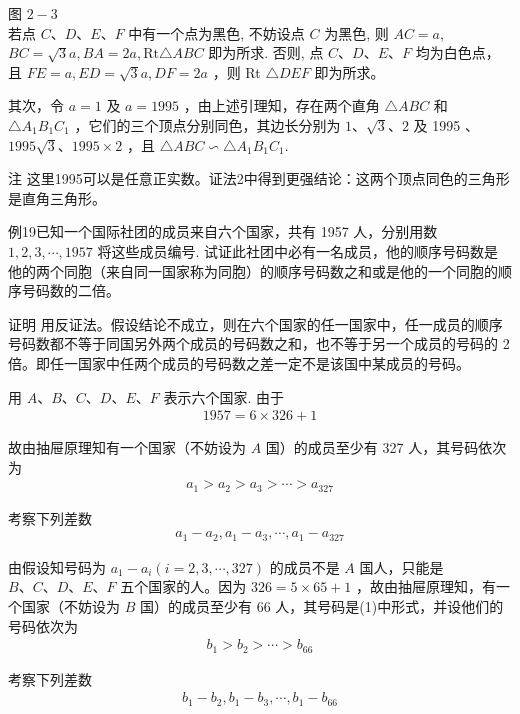 \documentclass[10pt]{article}
\begin{document}
图 $2-3$\\
若点 $C 、 D 、 E 、 F$ 中有一个点为黑色, 不妨设点 $C$ 为黑色, 则 $A C=a$, $B C=\sqrt{3} a, B A=2 a, \mathrm{Rt} \triangle A B C$ 即为所求. 否则, 点 $C 、 D 、 E 、 F$ 均为白色点，且 $F E=a, E D=\sqrt{3} a, D F=2 a$ ，则 Rt $\triangle D E F$ 即为所求。

其次，令 $a=1$ 及 $a=1995$ ，由上述引理知，存在两个直角 $\triangle A B C$ 和 $\triangle A_{1} B_{1} C_{1}$ ，它们的三个顶点分别同色，其边长分别为 $1 、 \sqrt{3} 、 2$ 及 1995 、 $1995 \sqrt{3} 、 1995 \times 2$ ，且 $\triangle A B C \backsim \triangle A_{1} B_{1} C_{1}$.

注 这里1995可以是任意正实数。证法2中得到更强结论：这两个顶点同色的三角形是直角三角形。

例19已知一个国际社团的成员来自六个国家，共有 1957 人，分别用数 $1,2,3, \cdots, 1957$ 将这些成员编号. 试证此社团中必有一名成员，他的顺序号码数是他的两个同胞（来自同一国家称为同胞）的顺序号码数之和或是他的一个同胞的顺序号码数的二倍。

证明 用反证法。假设结论不成立，则在六个国家的任一国家中，任一成员的顺序号码数都不等于同国另外两个成员的号码数之和，也不等于另一个成员的号码的 2 倍。即任一国家中任两个成员的号码数之差一定不是该国中某成员的号码。

用 $A 、 B 、 C 、 D 、 E 、 F$ 表示六个国家. 由于\\
\begin{align*}
1957=6 \times 326+1
\end{align*}

故由抽屉原理知有一个国家（不妨设为 $A$ 国）的成员至少有 327 人，其号码依次为\\
\begin{align*}
a_{1}>a_{2}>a_{3}>\cdots>a_{327}
\end{align*}

考察下列差数\\
\begin{align*}
a_{1}-a_{2}, a_{1}-a_{3}, \cdots, a_{1}-a_{327}
\end{align*}

由假设知号码为 $a_{1}-a_{i}(i=2,3, \cdots, 327)$ 的成员不是 $A$ 国人，只能是 $B 、 C 、 D 、 E 、 F$ 五个国家的人。因为 $326=5 \times 65+1$ ，故由抽屉原理知，有一个国家（不妨设为 $B$ 国）的成员至少有 66 人，其号码是(1)中形式，并设他们的号码依次为\\
\begin{align*}
b_{1}>b_{2}>\cdots>b_{66}
\end{align*}

考察下列差数\\
\begin{align*}
b_{1}-b_{2}, b_{1}-b_{3}, \cdots, b_{1}-b_{66}
\end{align*}
\end{document}
